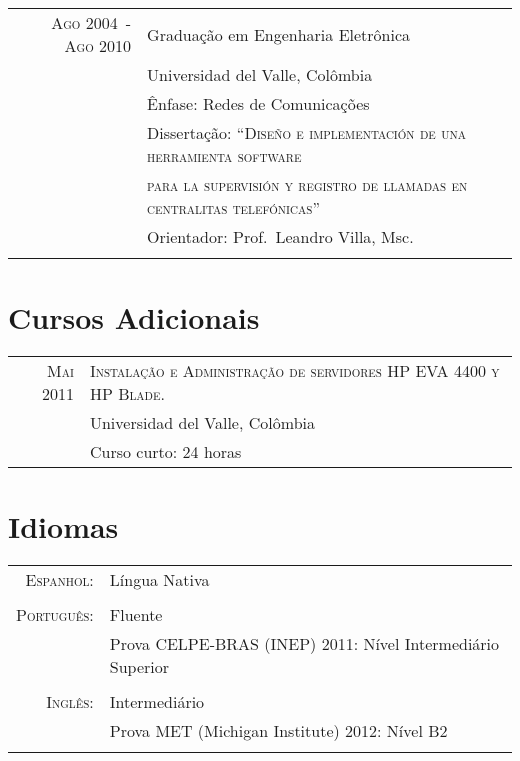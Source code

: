 \documentclass[a4paper,10pt]{article}
\begin{document}
\begin{tabular}{rl}
    \textsc{Ago 2004~-~Ago 2010}    & Graduação em Engenharia Eletrônica\\
                                    & Universidad del Valle, Colômbia \\
                                    & Ênfase: Redes de Comunicações \\
                                    & Dissertação: ``\textsc{Diseño e implementación de una herramienta software} \\
                                    & \textsc{para la supervisión y registro de llamadas en centralitas telefónicas}'' \\
                                    & Orientador: Prof.~Leandro Villa, Msc. \\
                                    &\\

\end{tabular}

\section{Cursos Adicionais}
\begin{tabular}{rl}	

  \textsc{Mai 2011} & \textsc{Instalação e Administração de servidores HP EVA 4400 y HP Blade.} \\
                    & Universidad del Valle, Colômbia \\
                    & Curso curto: 24 horas \\

\end{tabular}

\section{Idiomas}
\begin{tabular}{rl}

    \textsc{Espanhol:}      & Língua Nativa\\
                            &\\

    \textsc{Português:}     & Fluente\\
                            & Prova \textsc{CELPE-BRAS} (INEP) 2011: Nível Intermediário Superior\\
                            &\\

    \textsc{Inglês:}        & Intermediário\\
                            & Prova \textsc{MET} (Michigan Institute) 2012: Nível B2 \\
                            &\\

\end{tabular}
\end{document}
